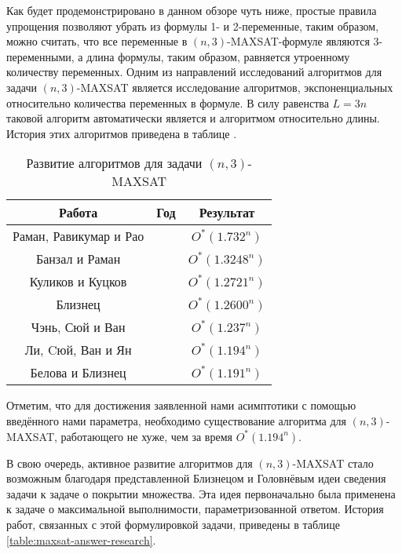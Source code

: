 Как будет продемонстрировано в данном обзоре чуть ниже, простые правила упрощения позволяют убрать из формулы 1- и 2-переменные, таким образом, можно считать, что все переменные в $(n,3)$-MAXSAT-формуле являются 3-переменными, а длина формулы, таким образом, равняется утроенному количеству переменных. Одним из направлений исследований алгоритмов для задачи $(n,3)$-MAXSAT является исследование алгоритмов, экспоненциальных относительно количества переменных в формуле. В силу равенства $L = 3n$ таковой алгоритм автоматически является и алгоритмом относительно длины. История этих алгоритмов приведена в таблице \label{table:n3-maxsat-research}.

\begin{table}[ht]
 \caption{Развитие алгоритмов для задачи $(n,3)$-MAXSAT}
 \centering
 \begin{tabular}{|c|c|c|}
  \hline
  \textbf{Работа} & \textbf{Год} & \textbf{Результат} \\
  \hline
  Раман, Равикумар и Рао \cite{raman1998simplified} & \citeyear{raman1998simplified} & $O^*(1.732^n)$ \\
  Банзал и Раман \cite{bansal99} & \citeyear{bansal99} & $O^*(1.3248^n)$ \\
  Куликов и Куцков \cite{kulikov2009new} & \citeyear{kulikov2009new} & $O^*(1.2721^n)$ \\
  Близнец \cite{bliznets2013new} & \citeyear{bliznets2013new} & $O^*(1.2600^n)$ \\
  Чэнь, Сюй и Ван \cite{chen15} & \citeyear{chen15} & $O^*(1.237^n)$ \\
  Ли, Cюй, Ван и Ян \cite{li2017improved} & \citeyear{li2017improved} & $O^*(1.194^n)$ \\
  Белова и Близнец \cite{belova18} & \citeyear{belova18} & $O^*(1.191^n)$ \\
  \hline
 \end{tabular}
 \label{table:n3-maxsat-research}
\end{table}

Отметим, что для достижения заявленной нами асимптотики с помощью введённого нами параметра, необходимо существование алгоритма для $(n,3)$-MAXSAT, работающего не хуже, чем за время $O^*(1.194^n)$.

В свою очередь, активное развитие алгоритмов для $(n,3)$-MAXSAT стало возможным благодаря представленной Близнецом и Головнёвым \cite{bliznets12} идеи сведения задачи к задаче о покрытии множества. Эта идея первоначально была применена к задаче о максимальной выполнимости, параметризованной ответом. История работ, связанных с этой формулировкой задачи, приведены в таблице \ref{table:maxsat-answer-research}.

